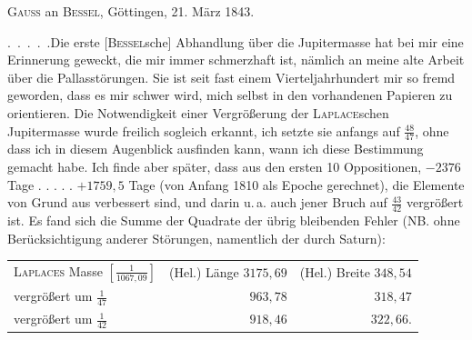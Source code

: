 \par{}\bigskip
\begin{center}
\textsc{Gauss} an \textsc{Bessel}, Göttingen, 21. März 1843.
\end{center}
\noindent\hspace*{\parindent}\mbox{. . . . .}\quad Die erste [\textsc{Bessel}sche] Abhandlung über die Jupitermasse hat bei mir eine Erinnerung geweckt, die mir immer schmerzhaft ist, nämlich an meine alte Arbeit über die Pallasstörungen. Sie ist seit fast einem Vierteljahrhundert mir so fremd geworden, dass es mir schwer wird, mich selbst in den vorhandenen Papieren zu orientieren. Die Notwendigkeit einer Vergrößerung der \textsc{Laplace}schen Jupitermasse wurde freilich sogleich erkannt, ich setzte sie anfangs auf \(\frac{48}{47}\), ohne dass ich in diesem Augenblick ausfinden kann, wann ich diese Bestimmung gemacht habe. Ich finde aber später, dass aus den ersten 10 Oppositionen, \(-2376\) Tage . . . . . \(+1759{,}5\) Tage (von Anfang 1810 als Epoche gerechnet), die Elemente von Grund aus verbessert sind, und darin u.\,a. auch jener Bruch auf \(\frac{43}{42}\) vergrößert ist. Es fand sich die Summe der Quadrate der übrig bleibenden Fehler (NB. ohne Berücksichtigung anderer Störungen, namentlich der durch Saturn):
\begin{center}
\renewcommand{\arraystretch}{1.3}
\begin{tabular}{@{}lrr@{}}
\textsc{Laplaces} Masse \(\left[\frac{1}{1067{,}09}\right]\) & (Hel.) Länge \(3175{,}69\) & (Hel.) Breite \(348{,}54\) \\
vergrößert um \(\frac{1}{47}\) & \(963{,}78\) & \(318{,}47\) \\
vergrößert um \(\frac{1}{42}\) & \(918{,}46\) & \(322{,}66\).
\end{tabular}
\end{center}
